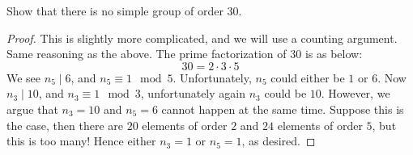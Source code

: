 \begin{prob}[F2017-Q1]
    Show that there is no simple group of order $30$.
\end{prob}
\begin{proof}
    This is slightly more complicated, and we will use a counting argument. 
    Same reasoning as the above. The prime factorization of $30$ is as below:
    \begin{equation*}
        30=2\cdot 3\cdot 5
    \end{equation*}
    We see $n_5\mid 6$, and $n_5\equiv 1\mod 5$. Unfortunately, $n_5$ could either be $1$ or $6$. Now $n_3\mid 10$, and $n_3\equiv 1\mod 3$, unfortunately again $n_3$ could be $10$. However, we argue that $n_3=10$ and $n_5=6$ cannot happen at the same time. Suppose this is the case, then there are $20$ elements of order $2$ and $24$ elements of order $5$, but this is too many! Hence either $n_3=1$ or $n_5=1$, as desired.
\end{proof}




